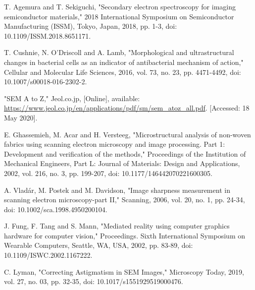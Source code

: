 \documentclass[12pt, conference]{IEEEtran}
\begin{document}
\begin{thebibliography}{00}
    T. Agemura and T. Sekiguchi, "Secondary electron spectroscopy for imaging semiconductor materials," 2018 International Symposium on Semiconductor Manufacturing (ISSM), Tokyo, Japan, 2018, pp. 1-3, doi: 10.1109/ISSM.2018.8651171.

    T. Cushnie, N. O’Driscoll and A. Lamb, "Morphological and ultrastructural changes in bacterial cells as an indicator of antibacterial mechanism of action," Cellular and Molecular Life Sciences, 2016, vol. 73, no. 23, pp. 4471-4492, doi: 10.1007/s00018-016-2302-2.

    "SEM A to Z," Jeol.co.jp, [Online], available: \url{https://www.jeol.co.jp/en/applications/pdf/sm/sem_atoz_all.pdf}. [Accessed: 18 May 2020].

    E. Ghassemieh, M. Acar and H. Versteeg, "Microstructural analysis of non-woven fabrics using scanning electron microscopy and image processing. Part 1: Development and verification of the methods," Proceedings of the Institution of Mechanical Engineers, Part L: Journal of Materials: Design and Applications, 2002, vol. 216, no. 3, pp. 199-207, doi: 10.1177/146442070221600305.

    A. Vladár, M. Postek and M. Davidson, "Image sharpness measurement in scanning electron microscopy-part II," Scanning, 2006, vol. 20, no. 1, pp. 24-34, doi: 10.1002/sca.1998.4950200104.

    J. Fung, F. Tang and S. Mann, "Mediated reality using computer graphics hardware for computer vision," Proceedings. Sixth International Symposium on Wearable Computers, Seattle, WA, USA, 2002, pp. 83-89, doi: 10.1109/ISWC.2002.1167222.

    C. Lyman, "Correcting Astigmatism in SEM Images," Microscopy Today, 2019, vol. 27, no. 03, pp. 32-35, doi: 10.1017/s1551929519000476.




\end{thebibliography}
\end{document}
